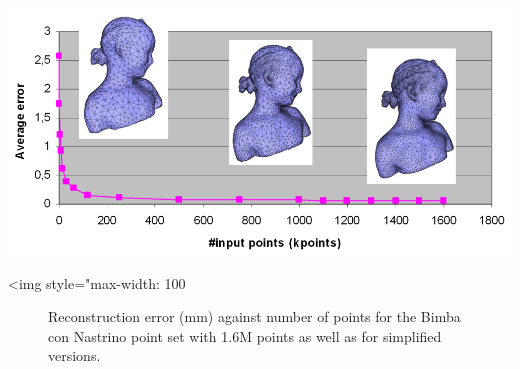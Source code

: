 \begin{center}
    \begin{ccTexOnly}
        \includegraphics[width=1.0\textwidth]{Surface_reconstruction_points_3/simplification_bench}
    \end{ccTexOnly}
    \begin{ccHtmlOnly}
        <img style="max-width: 100%
    \end{ccHtmlOnly}
    \begin{figure}[h]
        \caption{Reconstruction error (mm) against number of points
                 for the Bimba con Nastrino point set with 1.6M points
                 as well as for simplified versions.}
        \label{Surface_reconstruction_points_3-fig-simplification_bench}
    \end{figure}
\end{center}





